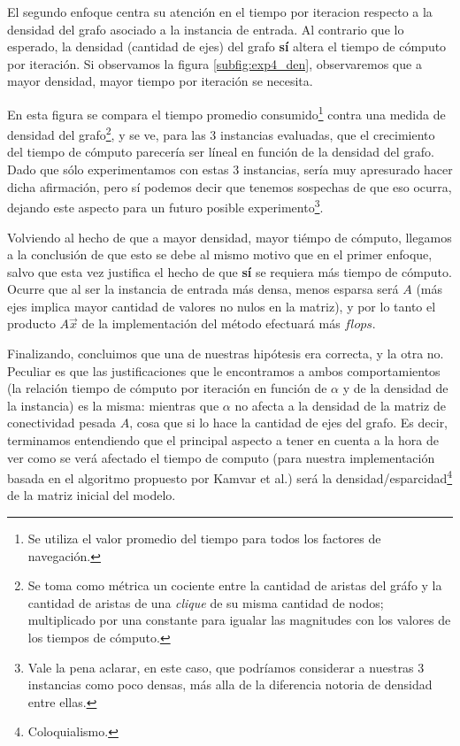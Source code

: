\par El segundo enfoque centra su atención en el tiempo por
iteracion respecto a la densidad del grafo asociado a la instancia de entrada.
Al contrario que lo esperado, la densidad (cantidad de ejes) del
grafo \textbf{s\'i} altera el tiempo de cómputo por iteración. Si observamos la
figura \ref{subfig:exp4_den}, observaremos que a mayor densidad, mayor tiempo
por iteraci\'on se necesita.

\par En esta figura se compara el tiempo promedio consumido\footnote{Se utiliza
el valor promedio del tiempo para todos los factores de navegación.} contra una
medida de densidad del grafo\footnote{Se toma como métrica un cociente entre la
cantidad de aristas del gráfo y la cantidad de aristas de una \emph{clique} de
su misma cantidad de nodos; multiplicado por una constante para igualar las
magnitudes con los valores de los tiempos de c\'omputo.}, y se ve, para las 3
instancias evaluadas, que el crecimiento del tiempo de c\'omputo parecer\'ia ser
l\'ineal en funci\'on de la densidad del grafo. Dado que s\'olo experimentamos
con estas 3 instancias, ser\'ia muy apresurado hacer dicha afirmaci\'on, pero sí
podemos decir que tenemos sospechas de que eso ocurra, dejando este aspecto para
un futuro posible experimento\footnote{Vale la pena aclarar, en este caso, que
podr\'iamos considerar a nuestras 3 instancias como poco densas, m\'as alla de
la diferencia notoria de densidad entre ellas.}.

\par Volviendo al hecho de que a mayor densidad, mayor ti\'empo de c\'omputo,
llegamos a la conclusi\'on de que esto se debe al mismo motivo que en el primer
enfoque, salvo que esta vez justifica el hecho de que \textbf{s\'i} se requiera
m\'as tiempo de c\'omputo. Ocurre que al ser la instancia de entrada m\'as
densa, menos esparsa ser\'a $A$ (m\'as ejes implica mayor cantidad de valores no
nulos en la matriz), y por lo tanto el producto $A\vec{x}$ de la
implementaci\'on del m\'etodo efectuar\'a m\'as $flops$.

\medskip
\par Finalizando, concluimos que una de nuestras hip\'otesis era correcta, y la
otra no. Peculiar es que las justificaciones que le encontramos a ambos
comportamientos (la relaci\'on tiempo de c\'omputo por iteraci\'on en funci\'on
de $\alpha$ y de la densidad de la instancia) es la misma: mientras que $\alpha$
no afecta a la densidad de la matriz de conectividad pesada $A$, cosa que si lo
hace la cantidad de ejes del grafo. Es decir, terminamos entendiendo que el
principal aspecto a tener en cuenta a la hora de ver como se ver\'a afectado el
tiempo de computo (para nuestra implementaci\'on basada en el algoritmo
propuesto por Kamvar et al.\cite{Kamvar2003}) ser\'a la
densidad/esparcidad\footnote{Coloquialismo.} de la matriz inicial del modelo.
